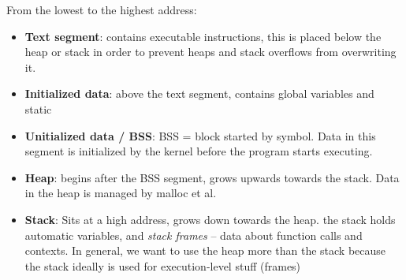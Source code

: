 From the lowest to the highest address:
\begin{itemize}
\item \textbf{Text segment}: contains executable instructions, this is placed
  below the heap or stack in order to prevent heaps and stack overflows from
  overwriting it.
\item \textbf{Initialized data}: above the text segment, contains global
  variables and static 
\item \textbf{Unitialized data / BSS}: BSS = block started by symbol. Data in
  this segment is initialized by the kernel before the program starts executing.
\item \textbf{Heap}: begins after the BSS segment, grows upwards towards the
  stack. Data in the heap is managed by malloc et al.
\item \textbf{Stack}: Sits at a high address, grows down towards the heap. the
  stack holds automatic variables, and \textit{stack frames} -- data about
  function calls and contexts. In general, we want to use the heap more than the
  stack because the stack ideally is used for execution-level stuff (frames)
\end{itemize}


